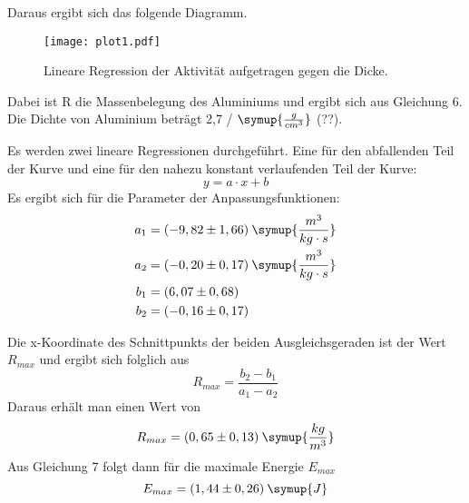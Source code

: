 Daraus ergibt sich das folgende Diagramm.

\begin{figure}[H]
  \centering
  \texttt{[image: plot1.pdf]}
  \caption{Lineare Regression der Aktivität aufgetragen gegen die Dicke.}
  \label{fig:plot1}
\end{figure}

Dabei ist R die Massenbelegung des Aluminiums und ergibt sich aus Gleichung 6.
Die Dichte von Aluminium beträgt 2,7 / $\symup{\frac{g}{cm^3}}$ (??).

Es werden zwei lineare Regressionen durchgeführt. Eine für den abfallenden Teil der Kurve
und eine für den nahezu konstant verlaufenden Teil der Kurve:
\begin{equation*}
  y = a\cdot x + b
\end{equation*}
Es ergibt sich für die Parameter der  Anpassungsfunktionen:
\begin{align*}
  a_1 &= (-9,82 \pm 1,66) \: \symup{\frac{m^3}{kg\cdot s}} \\
  a_2 &= (-0,20 \pm 0,17) \: \symup{\frac{m^3}{kg\cdot s}} \\
  b_1 &= (6,07 \pm 0,68) \\
  b_2 &= (-0,16 \pm 0,17)
\end{align*}

Die x-Koordinate des Schnittpunkts der beiden Ausgleichsgeraden ist der Wert $R_{max}$ und ergibt
sich folglich aus
\begin{equation*}
  R_{max} = \frac{b_2 - b_1}{a_1 - a_2}
\end{equation*}
Daraus erhält man einen Wert von
\begin{equation*}
  R_{max} = (0,65 \pm 0,13) \: \symup{\frac{kg}{m^3}}
\end{equation*}
Aus Gleichung 7 folgt dann für die maximale Energie $E_{max}$
\begin{equation*}
  E_{max} = (1,44 \pm 0,26) \: \symup{J}
\end{equation*}
